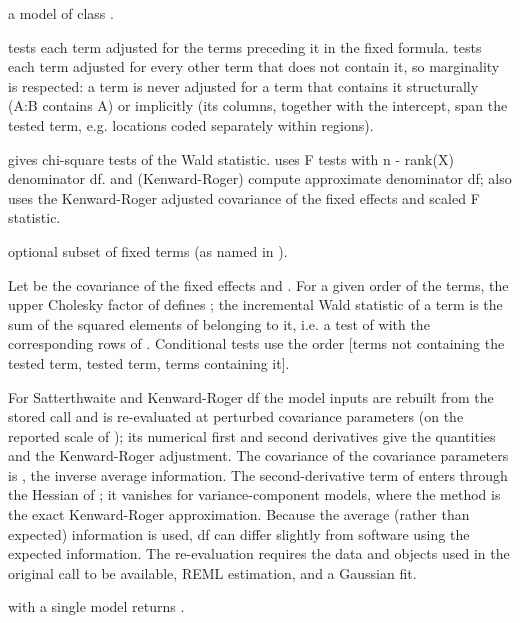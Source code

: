 \documentclass[a4paper]{book}
\begin{document}
%
\begin{Arguments}
\begin{ldescription}
\item[\code{object}] a model of class .
\item[\code{ssType}]  tests each term adjusted for the terms
preceding it in the fixed formula.  tests each term
adjusted for every other term that does not contain it, so marginality is
respected: a term is never adjusted for a term that contains it
structurally (A:B contains A) or implicitly (its columns, together with the
intercept, span the tested term, e.g. locations coded separately within
regions).
\item[\code{denDF}]  gives chi-square tests of the Wald statistic.
 uses F tests with n - rank(X) denominator df.
 and  (Kenward-Roger) compute approximate
denominator df;  also uses the Kenward-Roger adjusted covariance
of the fixed effects and scaled F statistic.
\item[\code{terms}] optional subset of fixed terms (as named in ).
\end{ldescription}
\end{Arguments}
%
\begin{Details}\relax
Let \eqn{\Phi}{} be the covariance of the fixed effects and .
For a given order of the terms, the upper Cholesky factor  of 
defines ; the incremental Wald statistic of a term is the sum of the
squared elements of  belonging to it, i.e. a test of  with
 the corresponding rows of . Conditional tests use the order
[terms not containing the tested term, tested term, terms containing it].

For Satterthwaite and Kenward-Roger df the model inputs are rebuilt from the
stored call and  is re-evaluated at perturbed covariance
parameters (on the reported scale of ); its numerical first and
second derivatives give the quantities  and the Kenward-Roger
adjustment. The covariance of the covariance parameters is ,
the inverse average information. The second-derivative term of 
enters through the Hessian of ; it vanishes for
variance-component models, where the method is the exact Kenward-Roger
approximation. Because the average (rather than expected) information is
used, df can differ slightly from software using the expected information.
The re-evaluation requires the data and objects used in the original call
to be available, REML estimation, and a Gaussian fit.

 with a single model returns .
\end{Details}
\end{document}
